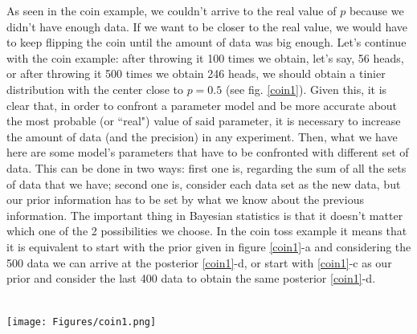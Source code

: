 \documentclass[onecolumn,           %
               showpacs,            %
               preprintnumbers,     %
               aps,                 %
               prl,          	    %
               letterpaper,             %
               superscriptaddress,      %
               nofootinbib,         %
               tightenlines,        %
               floats,floatfix      %
               ,usenatbib,
               ]{revtex4-1}
\begin{document}
As seen in the coin example, we couldn't arrive to the real value of $p$ because we didn't have enough data. If we want to be closer to the real value, we would have to keep flipping the coin until the amount of data was big enough. Let's continue with the coin example: after throwing it 100 times we obtain, let's say, 56 heads, or after throwing it 500 times we obtain 246 heads, we should obtain a tinier distribution with the center close to $p=0.5$ (see fig. \ref{coin1}). Given this, it is clear that, in order to confront a parameter model and be more accurate about the most probable (or ``real") value of said parameter, it is necessary to increase the amount of data (and the precision) in any experiment. 
Then, what we have here are some model's parameters that have to be confronted with different set of data. This can be done in two ways: first one is, regarding the sum of all the sets of data that we have; second one is, consider each data set as the new data, but our prior information has to be set by what we know about the previous information. The important thing in Bayesian statistics is that it doesn't matter which one of the 2 possibilities we choose. In the coin toss example it means that it is equivalent to start with the prior given in figure \ref{coin1}-a and considering the 500 data we can arrive at the posterior \ref{coin1}-d, or start with \ref{coin1}-c as our prior and consider the last 400 data to obtain the same posterior \ref{coin1}-d. \\ $ $ \\
\begin{minipage}{\textwidth}
\centering
\texttt{[image: Figures/coin1.png]}
\label{coin1}
\end{minipage}
\\$ $ \\
\end{document}
